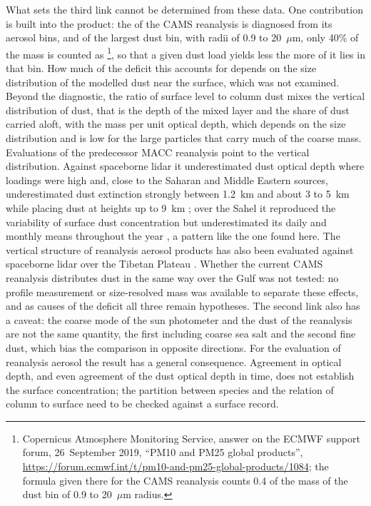 What sets the third link cannot be determined from these data. One contribution is built into
the product: the \pmten{} of the CAMS reanalysis is diagnosed from its aerosol bins, and of the
largest dust bin, with radii of 0.9 to 20~$\mu$m, only 40\% of the mass is counted as
\pmten{}\footnote{Copernicus Atmosphere Monitoring Service, answer on the ECMWF support forum,
26~September 2019, ``PM10 and PM25 global products'',
\url{https://forum.ecmwf.int/t/pm10-and-pm25-global-products/1084}; the formula given there for
the CAMS reanalysis counts 0.4 of the mass of the dust bin of 0.9 to 20~$\mu$m radius.}, so that a
given dust load yields less \pmten{} the more of it lies in that bin. How much of the deficit this
accounts for depends on the size distribution of the modelled dust near the surface, which was not
examined. Beyond the diagnostic, the ratio of surface level to
column dust mixes the vertical distribution of dust, that is the depth of the mixed layer and the
share of dust carried aloft, with the mass per unit optical depth, which depends on the size
distribution and is low for the large particles that carry much of the coarse mass. Evaluations of the
predecessor MACC reanalysis point to the vertical distribution. Against spaceborne lidar it
underestimated dust optical depth where loadings were high and, close to the Saharan and Middle
Eastern sources, underestimated dust extinction strongly between 1.2~km and about 3 to 5~km while
placing dust at heights up to 9~km \citep{georgoulias2018}; over the Sahel it reproduced the
variability of surface dust concentration but underestimated its daily and monthly means throughout
the year \citep{cuevas2015}, a pattern like the one found here. The vertical structure of reanalysis aerosol
products has also been evaluated against spaceborne lidar over the Tibetan Plateau
\citep{zhang2025tp}. Whether the current CAMS reanalysis distributes dust in the same way over the
Gulf was not tested: no profile measurement or size-resolved mass was available to separate these
effects, and as causes of the deficit all three remain hypotheses. The second link also has a caveat: the coarse mode of the sun photometer and the dust
of the reanalysis are not the same quantity, the first including coarse sea salt and the second
fine dust, which bias the comparison in opposite directions. For the evaluation of reanalysis
aerosol the result has a general consequence. Agreement in optical depth, and even agreement of
the dust optical depth in time, does not establish the surface concentration; the partition
between species and the relation of column to surface need to be checked against a surface
record.

